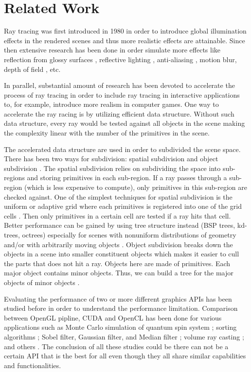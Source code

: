 \section{Related Work}
Ray tracing was first introduced in 1980 \cite{whitted1979improved} in order to introduce global illumination effects in the rendered scenes and thus more realistic effects are attainable. Since then extensive research has been done in order simulate more effects like reflection from glossy surfaces \cite{cook1984distributed, ward1988ray}, reflective lighting \cite{amanatides1984ray}, anti-aliasing \cite{shirley2008realistic,pharr2016physically, cook1984distributed}, motion blur\cite{cook1984distributed, cook1986stochastic}, depth of field \cite{shinya1994post}, etc.

In parallel, substantial amount of research has been devoted to accelerate the process of ray tracing in order to include ray tracing in interactive applications to, for example, introduce more realism in computer games. One way to accelerate the ray racing is by utilizing efficient data structure. Without such data structure, every ray would be tested against all objects in the scene making the complexity linear with the number of the primitives in the scene. 

The accelerated data structure are used in order to subdivided the scene space. There has been two ways for subdivision: spatial subdivision and object subdivision \cite{pharr2016physically}. The spatial subdivision relies on subdividing the space into sub-regions and storing primitives in each sub-region. If a ray passes through a sub-region (which is less expensive to compute), only primitives in this sub-region are checked against. One of the simplest techniques for spatial subdivision is the uniform or adaptive grid where each primitives is registered into one of the grid cells \cite{Snyder:1987:RTC:37402.37417}. Then only primitives in a certain cell are tested if a ray hits that cell. Better performance can be gained by using tree structure instead (BSP trees, kd-trees, octrees) especially for scenes with nonuniform distributions of geometry and/or with arbitrarily moving objects \cite{foley2005kd}. Object subdivision breaks down the objects in a scene into smaller constituent objects which makes it easier to cull the parts that does not hit a ray. Objects here are made of primitives. Each major object contains minor objects. Thus, we can build a tree for the major objects of minor objects \cite{Kay:1986:RTC:15886.15916}. 

Evaluating the performance of two or more different graphics APIs has been studied before in order to understand the performance limitation. Comparison between OpenGL pipline, CUDA and OpenCL has been done for various applications such as Monte Carlo simulation of quantum spin system \cite{karimi2010performance}; sorting algorithms \cite{5161005}; Sobel filter, Gaussian filter, and Median filter \cite{6419068}; volume ray casting \cite{7833400}; and others \cite{komatsu2010evaluating}. The conclusion of all these studies could be there can not be a certain API that is the best for all even though they all share similar capabilities and functionalities. 